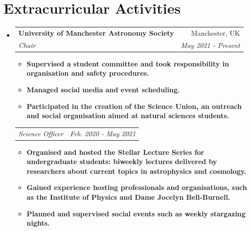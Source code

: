 \documentclass[letterpaper,11pt]{article}
\makeatletter
\newcommand{\resumeItem}[2]{
  \item\small{
    \textbf{#1}{ #2 \vspace{-2pt}}
  }
}
\newcommand{\resumeSubheading}[4]{
  \vspace{-1pt}\item
    \begin{tabular*}{0.97\textwidth}[t]{l@{\extracolsep{\fill}}r}
      \textbf{#1} & #2 \\
      \textit{\small#3} & \textit{\small #4} \\
    \end{tabular*}\vspace{-5pt}
}
\newcommand{\resumeSubHeadingListStart}{\begin{itemize}[leftmargin=*]}
\newcommand{\resumeSubHeadingListEnd}{\end{itemize}}
\newcommand{\resumeItemListStart}{\begin{itemize}}
\newcommand{\resumeItemListEnd}{\end{itemize}\vspace{-5pt}}
\newcommand{\resumeSubheadingtwo}[2]{
  \vspace{-1pt}
    \begin{tabular*}{0.97\textwidth}[t]{l@{\extracolsep{\fill}}r}
      \textit{\small#1} & \textit{\small #2} \\
    \end{tabular*}\vspace{-5pt}
}
\makeatother
\begin{document}
\section{Extracurricular Activities}
\resumeSubHeadingListStart
    \resumeSubheading
      {University of Manchester Astronomy Society}{Manchester, UK}
      {Chair}{May 2021 - Present}
      \resumeItemListStart
        \resumeItem
          {\normalfont Supervised a student committee and took responsibility in organisation and safety procedures.}{}
        \resumeItem
          {\normalfont Managed social media and event scheduling.}{}
        \resumeItem
          {\normalfont Participated in the creation of the Science Union, an outreach and social organisation aimed at natural sciences students.}{}
      \resumeItemListEnd
    \resumeSubheadingtwo
      {Science Officer}{Feb. 2020 - May 2021}
      \resumeItemListStart
        \resumeItem
          {\normalfont Organised and hosted the Stellar Lecture Series for undergraduate students:  biweekly lectures delivered by researchers about current topics in astrophysics and cosmology.}{}
        \resumeItem
          {\normalfont Gained experience hosting professionals and organisations, such as the Institute of Physics and Dame Jocelyn Bell-Burnell.}{}
        \resumeItem
          {\normalfont Planned and supervised social events such as weekly stargazing nights.}{}
      \resumeItemListEnd
    \resumeSubHeadingListEnd
  
\end{document}

